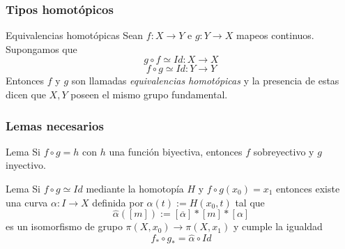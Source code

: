 \documentclass[xetex,mathserif,serif]{beamer}
\begin{document}
  \begin{frame}
    \frametitle{Tipos homotópicos}
    \begin{block}{Equivalencias homotópicas}
      Sean \(f : X \to Y\) e \(g : Y \to X\) mapeos continuos. Supongamos
      que \[ g \circ f \simeq Id : X \to X \]
      \[ f \circ g \simeq Id : Y \to Y \]
      Entonces \(f\) y \(g\) son llamadas \emph{equivalencias
      homotópicas} y la presencia de estas dicen que \(X,Y\) poseen el
      mismo grupo fundamental.
    \end{block}

  \end{frame}
  \begin{frame}
    \frametitle{Lemas necesarios}
    \begin{block}{Lema}
      Si \(f \circ g = h\) con \(h\) una función biyectiva, entonces
      \(f\) sobreyectivo y \(g\) inyectivo.
    \end{block}
    \begin{block}{Lema}
      Si \(f \circ g \simeq Id\) mediante la homotopía \(H\) y \(f \circ
      g (x_0) = x_1\) entonces existe una curva \(\alpha : I \to X\)
      definida por \(\alpha (t) := H (x_0 , t)\) tal que
      \[ \hat \alpha \left( [m] \right) := [ \overline \alpha] * [m] * [\alpha]\]
      es un isomorfismo de grupo \(\pi(X,x_0) \to \pi (X,x_1)\) y cumple
      la igualdad
      \[ f_* \circ g_* = \hat \alpha \circ Id \]
    \end{block}
  \end{frame}
\end{document}
